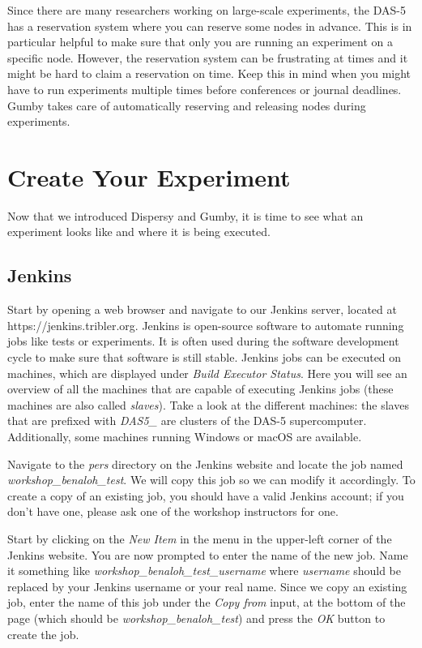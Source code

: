 \documentclass{article}
\begin{document}
Since there are many researchers working on large-scale experiments, the DAS-5 has a reservation system where you can reserve some nodes in advance.
This is in particular helpful to make sure that only you are running an experiment on a specific node.
However, the reservation system can be frustrating at times and it might be hard to claim a reservation on time.
Keep this in mind when you might have to run experiments multiple times before conferences or journal deadlines.
Gumby takes care of automatically reserving and releasing nodes during experiments.

\section{Create Your Experiment}
\label{sec:create_experiment}
Now that we introduced Dispersy and Gumby, it is time to see what an experiment looks like and where it is being executed.

\subsection{Jenkins}
Start by opening a web browser and navigate to our Jenkins server, located at  https://jenkins.tribler.org.
Jenkins is open-source software to automate running jobs like tests or experiments.
It is often used during the software development cycle to make sure that software is still stable.
Jenkins jobs can be executed on machines, which are displayed under \emph{Build Executor Status}.
Here you will see an overview of all the machines that are capable of executing Jenkins jobs (these machines are also called \emph{slaves}).
Take a look at the different machines: the slaves that are prefixed with \emph{DAS5\_} are clusters of the DAS-5 supercomputer.
Additionally, some machines running Windows or macOS are available.

Navigate to the \emph{pers} directory on the Jenkins website and locate the job named \emph{workshop\_benaloh\_test}.
We will copy this job so we can modify it accordingly.
To create a copy of an existing job, you should have a valid Jenkins account; if you don't have one, please ask one of the workshop instructors for one.

Start by clicking on the \emph{New Item} in the menu in the upper-left corner of the Jenkins website.
You are now prompted to enter the name of the new job.
Name it something like \emph{workshop\_benaloh\_test\_username} where \emph{username} should be replaced by your Jenkins username or your real name.
Since we copy an existing job, enter the name of this job under the \emph{Copy from} input, at the bottom of the page (which should be \emph{workshop\_benaloh\_test}) and press the \emph{OK} button to create the job.
\end{document}
